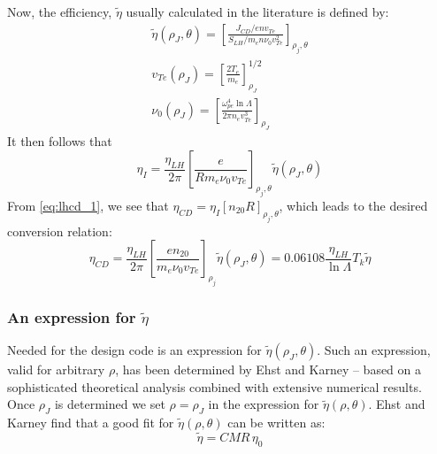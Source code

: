Now, the efficiency, $\tilde \eta$ usually calculated in the literature is defined by:
\begin{gather}
	\tilde { \eta } \left( \rho _ { J } , \theta \right) = \left[ \frac { J _ { C D } / e n v _ { Te } } { S _ { L H } / m _ { e } n \nu _ { 0 } v _ { T e } ^ { 2 } } \right] _ { \rho _ { j } , \theta } \\
	v _ { Te } \left( \rho _ { J } \right) = \left[ \frac { 2 T _ { e } } { m _ { e } } \right] _ { \rho _ { J } } ^ { 1 / 2 } \\
	\nu _ { 0 } \left( \rho _ { J } \right) = \left[ \frac { \omega _ { p e } ^ { 4 } \ln \Lambda } { 2 \pi n _ { e } v _ { T e } ^ { 3 } } \right] _ { \rho _ { J } }
\end{gather}
It then follows that
\begin{equation}
	\eta _ { I } = \frac { \eta _ { L H } } { 2 \pi } \left[ \frac { e } { R m _ { e } \nu _ { 0 } v _ { T e } } \right] _ { \rho _ { j } , \theta } \tilde { \eta } \left( \rho _ { J } , \theta \right)
\end{equation}
From \cref{eq:lhcd_1}, we see that $\eta _ { C D } = \eta _ { I } \left[ n _ { 20 } R \right] _ { \rho _ { j } , \theta }$, which leads to the desired conversion relation: 
\begin{equation}
	\eta _ { C D } = \frac { \eta _ { L H } } { 2 \pi } \left[ \frac { e n _ { 20 } } { m _ { e } \nu _ { 0 } v _ { Te } } \right] _ { \rho _ { j } } \tilde { \eta } \left( \rho _ { J } , \theta \right) = 0.06108 \frac { \eta _ { L H } } { \ln \Lambda } T _ { k } \tilde { \eta }
\end{equation}

\subsubsection{An expression for $\tilde \eta$}

Needed for the design code is an expression for $\tilde \eta(\rho_J, \theta)$. Such an expression, valid for arbitrary $\rho$, has been determined by Ehst and Karney\cite{ehstkarney} -- based on a sophisticated theoretical analysis combined with extensive numerical results. Once $\rho_J$ is determined we set $\rho = \rho_J$ in the expression for $\tilde \eta(\rho,\theta).$ Ehst and Karney find that a good fit for $\tilde \eta(\rho,\theta)$ can be written as:
\begin{equation}
	\label{eq:lhcd_2}
	\tilde { \eta } = C M R \, \eta _ { 0 }
\end{equation}

